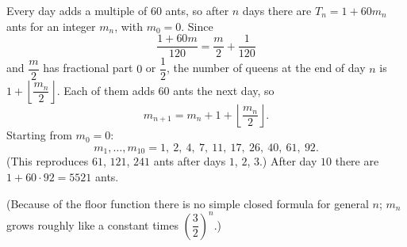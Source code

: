 Every day adds a multiple of $60$ ants, so after $n$ days there are $T_n=1+60m_n$ ants for an integer $m_n$, with $m_0=0$. Since
\[\dfrac{1+60m}{120}=\dfrac m2+\dfrac{1}{120}\]
and $\dfrac m2$ has fractional part $0$ or $\dfrac12$, the number of queens at the end of day $n$ is $1+\left\lfloor\dfrac{m_n}{2}\right\rfloor$. Each of them adds $60$ ants the next day, so
\[m_{n+1}=m_n+1+\left\lfloor\dfrac{m_n}{2}\right\rfloor .\]
Starting from $m_0=0$:
\[m_1,\dots,m_{10}=1,\ 2,\ 4,\ 7,\ 11,\ 17,\ 26,\ 40,\ 61,\ 92 .\]
(This reproduces $61$, $121$, $241$ ants after days $1$, $2$, $3$.) After day $10$ there are $1+60\cdot92=\boxed{5521}$ ants.

(Because of the floor function there is no simple closed formula for general $n$; $m_n$ grows roughly like a constant times $\left(\dfrac32\right)^n$.)
